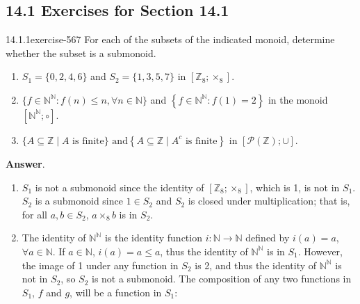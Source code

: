 \documentclass[twoside,10pt,]{book}
\numberwithin{equation}{section}
\begin{document}
\subsection*{14.1 Exercises for Section 14.1}
\begin{divisionsolution}{14.1.1}{}{exercise-567}%
\hypertarget{p-5073}{}%
For each of the subsets of the indicated monoid, determine whether the subset is a submonoid.\leavevmode%
\begin{enumerate}[label=(\alph*)]
\item\hypertarget{li-2307}{}\hypertarget{p-5074}{}%
\(S_1=\{0,2,4,6\}\) and  \(S_2=\{1,3,5,7\}\) in \([\mathbb{Z}_8;\times_8].\)%
\item\hypertarget{li-2308}{}\hypertarget{p-5075}{}%
\(\{f\in \mathbb{N}^{\mathbb{N}}:f(n) \leqslant n, \forall n \in \mathbb{N}\}\) and  \(\left\{f\in \mathbb{N}^{\mathbb{N}}:f(1)=2\right\}\) in the monoid \([\mathbb{N}^{\mathbb{N}};\circ]\).%
\item\hypertarget{li-2309}{}\hypertarget{p-5076}{}%
\(\{A\subseteq \mathbb{Z} \mid A \textrm{ is finite}\} \textrm{ and} \left\{A\subseteq \mathbb{Z} \mid A^c\textrm{ is} \textrm{ finite}\right\}\) in \([\mathcal{P}(\mathbb{Z});\cup].\)%
\end{enumerate}
%
\par\smallskip%
\noindent\textbf{Answer}.\quad%
\hypertarget{p-5077}{}%
\leavevmode%
\begin{enumerate}[label=(\alph*)]
\item\hypertarget{li-2310}{}\hypertarget{p-5078}{}%
\(S_1\) is not a submonoid since the identity of \(\left[\mathbb{Z}_8; \times_8\right]\), which is 1, is not in \(S_1\).   \(S_2\) is a submonoid since \(1 \in  S_2\) and \(S_2\) is closed under multiplication; that is, for all \(a, b \in  S_2\), \(a \times_8 b\) is in \(S_2\).%
\item\hypertarget{li-2311}{}\hypertarget{p-5079}{}%
The identity of \(\mathbb{N}^{\mathbb{N}}\) is the identity function \(i:\mathbb{N}\to \mathbb{N}\) defined by \(i(a) = a\), \(\forall a\in \mathbb{N}\).  If \(a \in \mathbb{N}\), \(i(a) = a \leq  a\), thus the identity of \(\mathbb{N}^{\mathbb{N}}\) is in \(S_1\). However, the image of 1 under any function in \(S_2\) is 2, and thus the identity of \(\mathbb{N}^{\mathbb{N}}\) is not in \(S_2\), so \(S_2\) is not a submonoid. The composition of any two functions in \(S_1\),  \(f\) and \(g\), will be a function in \(S_1\):%
\begin{equation*}

\end{equation*}
\end{enumerate}
\end{divisionsolution}
\end{document}
